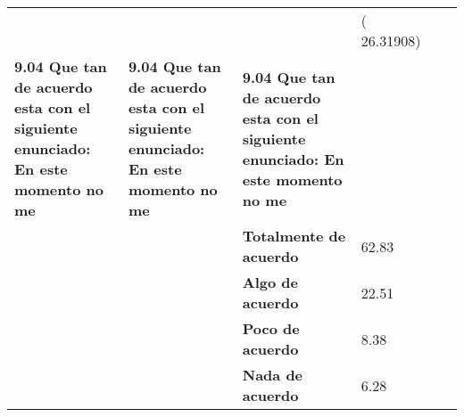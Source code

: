 \begin{longtable}{p{3cm}p{3cm}p{3cm}p{1.5cm}p{1.5cm}p{1.5cm}}
\textbf{ } & \textbf{ } & \textbf{ } & ( 26.31908) &       &  \\
\textbf{9.04 Que tan de acuerdo esta con el siguiente enunciado: En este momento no me} & \textbf{9.04 Que tan de acuerdo esta con el siguiente enunciado: En este momento no me} & \textbf{9.04 Que tan de acuerdo esta con el siguiente enunciado: En este momento no me} &       &       &  \\
\textbf{} & \textbf{} & \textbf{Totalmente de acuerdo       } & 62.83 &       &  \\
\textbf{} & \textbf{} & \textbf{Algo de acuerdo } & 22.51 &       &  \\
\textbf{} & \textbf{} & \textbf{Poco de acuerdo      } & 8.38  &       &  \\
\textbf{} & \textbf{} & \textbf{Nada de acuerdo      } & 6.28  &       &  \\
\bottomrule
\bottomrule
\end{longtable}%
